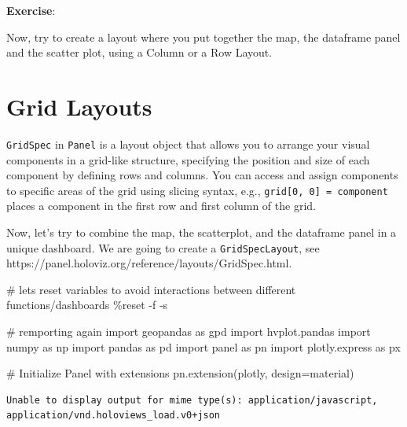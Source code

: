 \documentclass[
  letterpaper,
  DIV=11,
  numbers=noendperiod]{scrreprt}
\newenvironment{Shaded}{\begin{snugshade}}{\end{snugshade}}
\newcommand{\CommentTok}[1]{\textcolor[rgb]{0.37,0.37,0.37}{#1}}
\newcommand{\ImportTok}[1]{\textcolor[rgb]{0.00,0.46,0.62}{#1}}
\newcommand{\NormalTok}[1]{\textcolor[rgb]{0.00,0.23,0.31}{#1}}
\newcommand{\OperatorTok}[1]{\textcolor[rgb]{0.37,0.37,0.37}{#1}}
\newcommand{\StringTok}[1]{\textcolor[rgb]{0.13,0.47,0.30}{#1}}
\begin{document}
\textbf{Exercise}:

Now, try to create a layout where you put together the map, the
dataframe panel and the scatter plot, using a Column or a Row Layout.

\section{Grid Layouts}\label{grid-layouts}

\texttt{GridSpec} in \texttt{Panel} is a layout object that allows you
to arrange your visual components in a grid-like structure, specifying
the position and size of each component by defining rows and columns.
You can access and assign components to specific areas of the grid using
slicing syntax, e.g., \texttt{grid{[}0,\ 0{]}\ =\ component} places a
component in the first row and first column of the grid.

Now, let's try to combine the map, the scatterplot, and the dataframe
panel in a unique dashboard. We are going to create a
\texttt{GridSpecLayout}, see
https://panel.holoviz.org/reference/layouts/GridSpec.html.

\begin{Shaded}
\begin{Highlighting}[]
\CommentTok{\# let\textquotesingle{}s reset variables to avoid interactions between different functions/dashboards}
\OperatorTok{\%}\NormalTok{reset }\OperatorTok{{-}}\NormalTok{f }\OperatorTok{{-}}\NormalTok{s}

\CommentTok{\# remporting again}
\ImportTok{import}\NormalTok{ geopandas }\ImportTok{as}\NormalTok{ gpd}
\ImportTok{import}\NormalTok{ hvplot.pandas}
\ImportTok{import}\NormalTok{ numpy }\ImportTok{as}\NormalTok{ np}
\ImportTok{import}\NormalTok{ pandas }\ImportTok{as}\NormalTok{ pd}
\ImportTok{import}\NormalTok{ panel }\ImportTok{as}\NormalTok{ pn}
\ImportTok{import}\NormalTok{ plotly.express }\ImportTok{as}\NormalTok{ px}

\CommentTok{\# Initialize Panel with extensions}
\NormalTok{pn.extension(}\StringTok{\textquotesingle{}plotly\textquotesingle{}}\NormalTok{, design}\OperatorTok{=}\StringTok{\textquotesingle{}material\textquotesingle{}}\NormalTok{)}
\end{Highlighting}
\end{Shaded}

\begin{verbatim}
Unable to display output for mime type(s): application/javascript, application/vnd.holoviews_load.v0+json
\end{verbatim}
\end{document}
